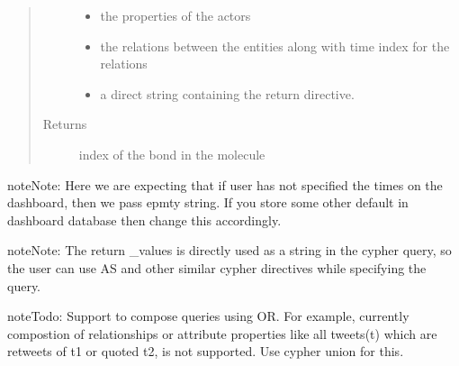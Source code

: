 \documentclass[letterpaper,10pt,english]{sphinxmanual}
\begin{document}
\begin{fulllineitems}
\begin{fulllineitems}
\begin{quote}
\begin{description}
\begin{itemize}
\item {} 
 \textendash{} the properties of the actors

\item {} 
 \textendash{} the relations between the entities along with time index for the relations

\item {} 
 \textendash{} a direct string containing the return directive.

\end{itemize}

\item[{Returns}] \leavevmode
index of the bond in the molecule

\end{description}\end{quote}

\begin{sphinxadmonition}{note}{Note:}
Here we are expecting that if user has not specified the times on the dashboard, then we pass epmty string. If you
store some other default in dashboard database then change this accordingly.
\end{sphinxadmonition}

\begin{sphinxadmonition}{note}{Note:}
The return \_values is directly used as a string in the cypher query, so the user can use AS and other similar cypher directives while specifying the query.
\end{sphinxadmonition}

\begin{sphinxadmonition}{note}{\label{neo4j_query_generation:index-0}Todo:}
Support to compose queries using OR. For example, currently compostion of relationships or attribute properties like all tweets(t) which are retweets of t1 or quoted t2, is not supported. Use cypher union for this.
\end{sphinxadmonition}

\end{fulllineitems}



\end{fulllineitems}
\end{document}
